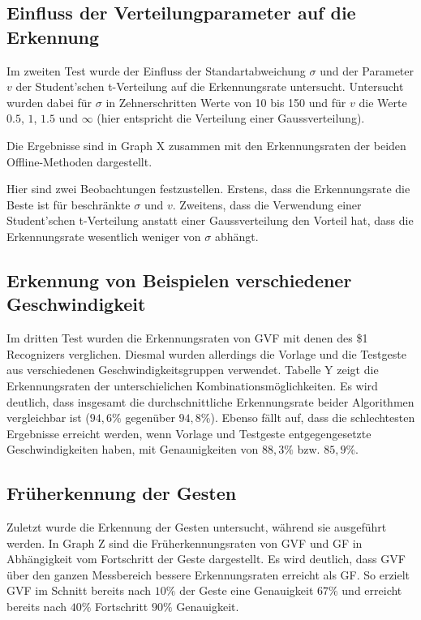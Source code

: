 \documentclass{llncs}
\begin{document}
\subsection{Einfluss der Verteilungparameter auf die Erkennung}
Im zweiten Test wurde der Einfluss der Standartabweichung $\sigma$ und der Parameter $v$ der Student'schen t-Verteilung auf die Erkennungsrate untersucht. Untersucht wurden dabei für $\sigma$ in Zehnerschritten Werte von 10 bis 150 und für $v$ die Werte $0.5$, $1$, $1.5$ und $\infty$ (hier entspricht die Verteilung einer Gaussverteilung).

Die Ergebnisse sind in Graph X zusammen mit den Erkennungsraten der beiden Offline-Methoden dargestellt.

Hier sind zwei Beobachtungen festzustellen. Erstens, dass die Erkennungsrate die Beste ist für beschränkte $\sigma$ und $v$. Zweitens, dass die Verwendung einer Student'schen t-Verteilung anstatt einer Gaussverteilung den Vorteil hat, dass die Erkennungsrate wesentlich weniger von $\sigma$ abhängt.

\subsection{Erkennung von Beispielen verschiedener Geschwindigkeit}
Im dritten Test wurden die Erkennungsraten von GVF mit denen des \$1 Recognizers verglichen. Diesmal wurden allerdings die Vorlage und die Testgeste aus verschiedenen Geschwindigkeitsgruppen verwendet. Tabelle Y zeigt die Erkennungsraten der unterschielichen Kombinationsmöglichkeiten. Es wird deutlich, dass insgesamt die durchschnittliche Erkennungsrate beider Algorithmen vergleichbar ist ($94,6\%$ gegenüber $94,8\%$). Ebenso fällt auf, dass die schlechtesten Ergebnisse erreicht werden, wenn Vorlage und Testgeste  entgegengesetzte Geschwindigkeiten haben, mit Genaunigkeiten von $88,3\%$ bzw. $85,9\%$.

\subsection{Früherkennung der Gesten}
Zuletzt wurde die Erkennung der Gesten untersucht, während sie ausgeführt werden. In Graph Z sind die Früherkennungsraten von GVF und GF in Abhängigkeit vom Fortschritt der Geste dargestellt. Es wird deutlich, dass GVF über den ganzen Messbereich bessere Erkennungsraten erreicht als GF. So erzielt GVF im Schnitt bereits nach $10\%$ der Geste eine Genauigkeit $67\%$ und erreicht bereits nach $40\%$ Fortschritt $90\%$ Genauigkeit.

  


\end{document}
